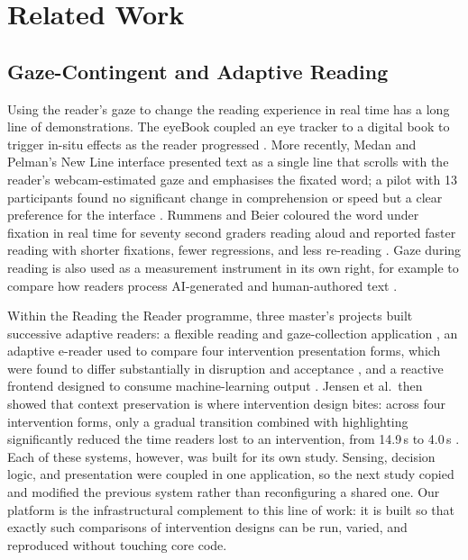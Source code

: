\section{Related Work}
\label{sec:related}

\subsection{Gaze-Contingent and Adaptive Reading}

Using the reader's gaze to change the reading experience in real time has a long line of demonstrations.
The eyeBook coupled an eye tracker to a digital book to trigger in-situ effects as the reader progressed \cite{biedert2010eyebook}.
More recently, Medan and Pelman's New Line interface presented text as a single line that scrolls with the reader's webcam-estimated gaze and emphasises the fixated word; a pilot with 13 participants found no significant change in comprehension or speed but a clear preference for the interface \cite{medan2024newline}.
Rummens and Beier coloured the word under fixation in real time for seventy second graders reading aloud and reported faster reading with shorter fixations, fewer regressions, and less re-reading \cite{rummens2025highlighting}.
Gaze during reading is also used as a measurement instrument in its own right, for example to compare how readers process AI-generated and human-authored text \cite{ilyas2025readersmind}.

Within the Reading the Reader programme, three master's projects built successive adaptive readers: a flexible reading and gaze-collection application \cite{refsgaard2024rtr}, an adaptive e-reader used to compare four intervention presentation forms, which were found to differ substantially in disruption and acceptance \cite{pereira2024typography}, and a reactive frontend designed to consume machine-learning output \cite{palinec2024reactive}.
Jensen et al.\ then showed that context preservation is where intervention design bites: across four intervention forms, only a gradual transition combined with highlighting significantly reduced the time readers lost to an intervention, from 14.9\,s to 4.0\,s \cite{jensen2025context}.
Each of these systems, however, was built for its own study.
Sensing, decision logic, and presentation were coupled in one application, so the next study copied and modified the previous system rather than reconfiguring a shared one.
Our platform is the infrastructural complement to this line of work: it is built so that exactly such comparisons of intervention designs can be run, varied, and reproduced without touching core code.

